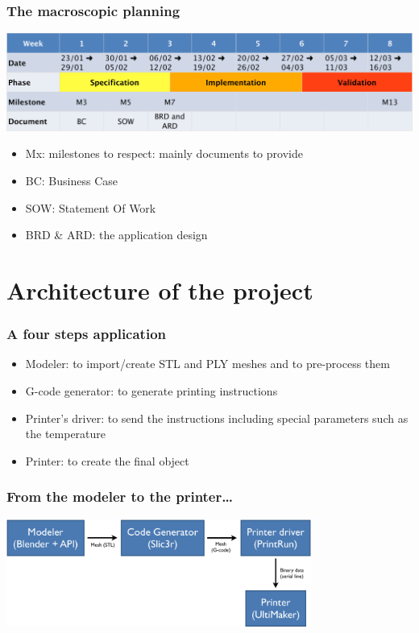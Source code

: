 \documentclass{beamer}
\begin{document}
\begin{frame}
	\frametitle{The macroscopic planning}

    \begin{center}
		\includegraphics[width=\textwidth]{planning}	
	\end{center}
	
	\begin{block}{}
    \begin{itemize}
		\item Mx: milestones to respect: mainly documents to provide
		\item BC: Business Case
		\item SOW: Statement Of Work
		\item BRD \& ARD: the application design 
	\end{itemize}
	\end{block}
	
\end{frame}


\section{Architecture of the project}

\begin{frame}
	\frametitle{A four steps application}
	
	\begin{block}{}
		\begin{itemize}
			\item Modeler: to import/create STL and PLY meshes and to pre-process them
			\item G-code generator: to generate printing instructions
			\item Printer's driver: to send the instructions including special parameters such as the temperature
			\item Printer: to create the final object
		\end{itemize}
	\end{block}
	
\end{frame}


\begin{frame}
	\frametitle{From the modeler to the printer…}

    \begin{center}
		\includegraphics[width=10cm]{schema}	
	\end{center}
	
\end{frame}
\end{document}
